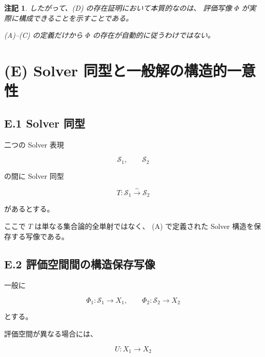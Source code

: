 \documentclass[a4paper,11pt]{article}
\newtheorem{remark}[definition]{注記}
\newcommand{\Solver}{\mathcal{S}}
\begin{document}
\begin{remark}
したがって、(D) の存在証明において本質的なのは、
評価写像 $\Phi$ が実際に構成できることを示すことである。

(A)--(C) の定義だけから $\Phi$ の存在が自動的に従うわけではない。
\end{remark}


\section{(E) Solver 同型と一般解の構造的一意性}

\subsection{E.1 Solver 同型}

二つの Solver 表現

\begin{equation}
    \Solver_1,\qquad\Solver_2
\end{equation}

の間に Solver 同型

\begin{equation}
    T:
    \Solver_1
    \overset{\sim}{\longrightarrow}
    \Solver_2
\end{equation}

があるとする。

ここで $T$ は単なる集合論的全単射ではなく、
(A) で定義された Solver 構造を保存する写像である。


\subsection{E.2 評価空間間の構造保存写像}

一般に

\begin{equation}
    \Phi_1:\Solver_1\to X_1,
    \qquad
    \Phi_2:\Solver_2\to X_2
\end{equation}

とする。

評価空間が異なる場合には、

\begin{equation}
    U:X_1\to X_2
\end{equation}
\end{document}
